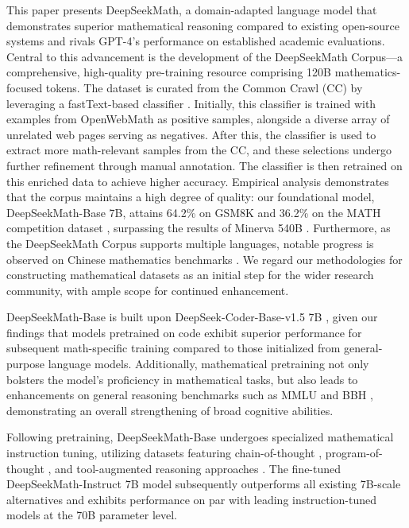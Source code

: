 This paper presents DeepSeekMath, a domain-adapted language model that demonstrates superior mathematical reasoning compared to existing open-source systems and rivals GPT-4’s performance on established academic evaluations. Central to this advancement is the development of the DeepSeekMath Corpus—a comprehensive, high-quality pre-training resource comprising 120B mathematics-focused tokens. The dataset is curated from the Common Crawl (CC) by leveraging a fastText-based classifier \citep{joulin2016fasttext}. Initially, this classifier is trained with examples from OpenWebMath \citep{openwebmath} as positive samples, alongside a diverse array of unrelated web pages serving as negatives. After this, the classifier is used to extract more math-relevant samples from the CC, and these selections undergo further refinement through manual annotation. The classifier is then retrained on this enriched data to achieve higher accuracy. Empirical analysis demonstrates that the corpus maintains a high degree of quality: our foundational model, DeepSeekMath-Base 7B, attains 64.2\% on GSM8K \citep{gsm8k} and 36.2\% on the MATH competition dataset \citep{MATH}, surpassing the results of Minerva 540B \citep{minerva}. Furthermore, as the DeepSeekMath Corpus supports multiple languages, notable progress is observed on Chinese mathematics benchmarks \citep{wei2023cmath,agieval}. We regard our methodologies for constructing mathematical datasets as an initial step for the wider research community, with ample scope for continued enhancement.

DeepSeekMath-Base is built upon DeepSeek-Coder-Base-v1.5 7B \citep{deepseek-coder}, given our findings that models pretrained on code exhibit superior performance for subsequent math-specific training compared to those initialized from general-purpose language models. Additionally, mathematical pretraining not only bolsters the model’s proficiency in mathematical tasks, but also leads to enhancements on general reasoning benchmarks such as MMLU \citep{mmlu} and BBH \citep{bbh}, demonstrating an overall strengthening of broad cognitive abilities.

Following pretraining, DeepSeekMath-Base undergoes specialized mathematical instruction tuning, utilizing datasets featuring chain-of-thought \citep{cot}, program-of-thought \citep{pot,pal}, and tool-augmented reasoning approaches \citep{tora}. The fine-tuned DeepSeekMath-Instruct 7B model subsequently outperforms all existing 7B-scale alternatives and exhibits performance on par with leading instruction-tuned models at the 70B parameter level.

